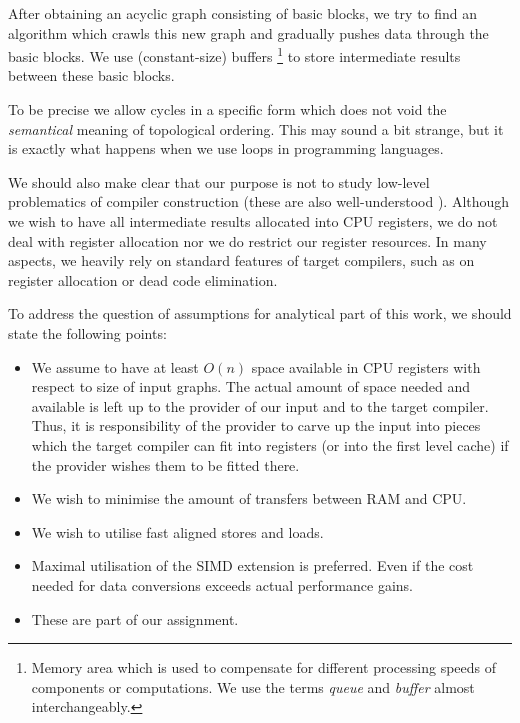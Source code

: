
  After obtaining an acyclic graph consisting of basic blocks, we try to find an algorithm which crawls this new graph and gradually pushes data through the basic blocks. We use (constant-size) buffers \footnote{Memory area which is used to compensate for different processing speeds of components or computations. We use the terms \emph{queue} and \emph{buffer} almost interchangeably.} to store intermediate results between these basic blocks.

\begin{rem}
  To be precise we allow cycles in a specific form which does not void the \emph{semantical} meaning of topological ordering. This may sound a bit strange, but it is exactly what happens when we use loops in programming languages.
\end{rem}

  We should also make clear that our purpose is not to study low-level problematics of compiler construction (these are also well-understood \cite{compilers}). Although we wish to have all intermediate results allocated into CPU registers, we do not deal with register allocation nor we do restrict our register resources. In many aspects, we heavily rely on standard features of target compilers, such as on register allocation or dead code elimination.

To address the question of assumptions for analytical part of this work, we should state the following points:
\begin{itemize}
  \item We assume to have at least $O(n)$ space available in CPU registers with respect to size of input graphs. The actual amount of space needed and available is left up to the provider of our input and to the target compiler. Thus, it is responsibility of the provider to carve up the input into pieces which the target compiler can fit into registers (or into the first level cache) if the provider wishes them to be fitted there.
  \item We wish to minimise the amount of transfers between RAM and CPU.
  \item We wish to utilise fast aligned stores and loads.
  \item Maximal utilisation of the SIMD extension is preferred. Even if the cost needed for data conversions exceeds actual performance gains.
  \item These are part of our assignment.
\end{itemize}

